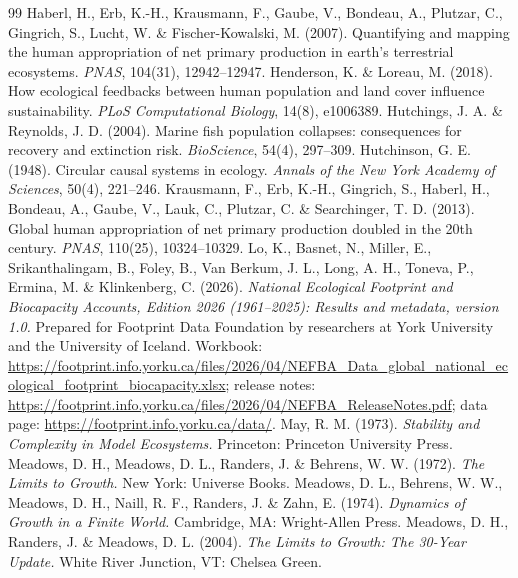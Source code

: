 \documentclass[preprint,12pt,authoryear]{elsarticle}
\begin{document}
\begin{thebibliography}{99}
 Haberl, H., Erb, K.-H., Krausmann, F., Gaube, V., Bondeau, A., Plutzar, C., Gingrich, S., Lucht, W. \& Fischer-Kowalski, M. (2007). Quantifying and mapping the human appropriation of net primary production in earth's terrestrial ecosystems. \emph{PNAS}, 104(31), 12942--12947.
 Henderson, K. \& Loreau, M. (2018). How ecological feedbacks between human population and land cover influence sustainability. \emph{PLoS Computational Biology}, 14(8), e1006389.
 Hutchings, J. A. \& Reynolds, J. D. (2004). Marine fish population collapses: consequences for recovery and extinction risk. \emph{BioScience}, 54(4), 297--309.
 Hutchinson, G. E. (1948). Circular causal systems in ecology. \emph{Annals of the New York Academy of Sciences}, 50(4), 221--246.
 Krausmann, F., Erb, K.-H., Gingrich, S., Haberl, H., Bondeau, A., Gaube, V., Lauk, C., Plutzar, C. \& Searchinger, T. D. (2013). Global human appropriation of net primary production doubled in the 20th century. \emph{PNAS}, 110(25), 10324--10329.
 Lo, K., Basnet, N., Miller, E., Srikanthalingam, B., Foley, B., Van Berkum, J. L., Long, A. H., Toneva, P., Ermina, M. \& Klinkenberg, C. (2026). \emph{National Ecological Footprint and Biocapacity Accounts, Edition 2026 (1961--2025): Results and metadata, version 1.0.} Prepared for Footprint Data Foundation by researchers at York University and the University of Iceland. Workbook: \url{https://footprint.info.yorku.ca/files/2026/04/NEFBA_Data_global_national_ecological_footprint_biocapacity.xlsx}; release notes: \url{https://footprint.info.yorku.ca/files/2026/04/NEFBA_ReleaseNotes.pdf}; data page: \url{https://footprint.info.yorku.ca/data/}.
 May, R. M. (1973). \emph{Stability and Complexity in Model Ecosystems.} Princeton: Princeton University Press.
 Meadows, D. H., Meadows, D. L., Randers, J. \& Behrens, W. W. (1972). \emph{The Limits to Growth.} New York: Universe Books.
 Meadows, D. L., Behrens, W. W., Meadows, D. H., Naill, R. F., Randers, J. \& Zahn, E. (1974). \emph{Dynamics of Growth in a Finite World.} Cambridge, MA: Wright-Allen Press.
 Meadows, D. H., Randers, J. \& Meadows, D. L. (2004). \emph{The Limits to Growth: The 30-Year Update.} White River Junction, VT: Chelsea Green.

\end{thebibliography}
\end{document}
